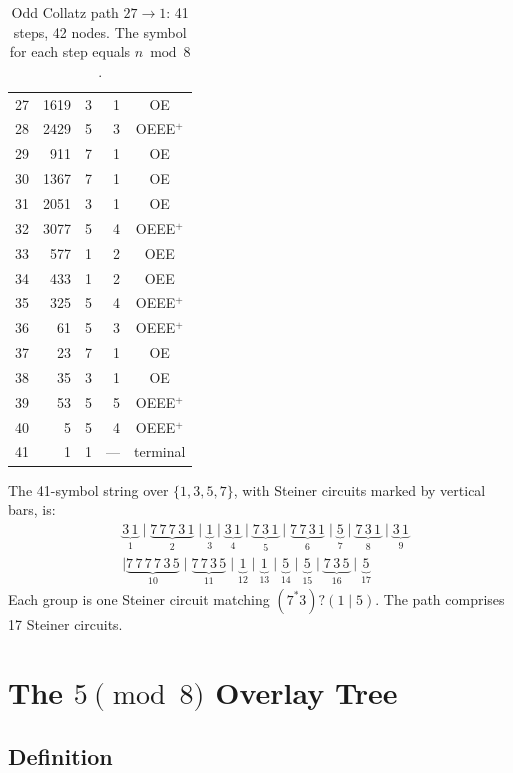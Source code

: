 \documentclass[11pt]{article}
\begin{document}
\begin{table}[h]
\begin{minipage}[t]{0.48\textwidth}
\begin{tabular}{rrrrc}
27 & 1619 & 3 & 1 & OE       \\
28 & 2429 & 5 & 3 & OEEE$^+$ \\
29 & 911  & 7 & 1 & OE       \\
30 & 1367 & 7 & 1 & OE       \\
31 & 2051 & 3 & 1 & OE       \\
32 & 3077 & 5 & 4 & OEEE$^+$ \\
33 & 577  & 1 & 2 & OEE      \\
34 & 433  & 1 & 2 & OEE      \\
35 & 325  & 5 & 4 & OEEE$^+$ \\
36 & 61   & 5 & 3 & OEEE$^+$ \\
37 & 23   & 7 & 1 & OE       \\
38 & 35   & 3 & 1 & OE       \\
39 & 53   & 5 & 5 & OEEE$^+$ \\
40 & 5    & 5 & 4 & OEEE$^+$ \\
41 & 1    & 1 & — & terminal \\
\hline
\end{tabular}
\end{minipage}
\caption{Odd Collatz path $27\to 1$: 41 steps, 42 nodes.  The symbol
  for each step equals $n\bmod 8$.}
\label{tab:path}
\end{table}

The 41-symbol string over $\{1,3,5,7\}$, with Steiner circuits marked by
vertical bars, is:
\begin{align*}
&\underbrace{3\,1}_{1}\mid
 \underbrace{7\,7\,7\,3\,1}_{2}\mid
 \underbrace{1}_{3}\mid
 \underbrace{3\,1}_{4}\mid
 \underbrace{7\,3\,1}_{5}\mid
 \underbrace{7\,7\,3\,1}_{6}\mid
 \underbrace{5}_{7}\mid
 \underbrace{7\,3\,1}_{8}\mid
 \underbrace{3\,1}_{9}\\
&\mid
 \underbrace{7\,7\,7\,7\,3\,5}_{10}\mid
 \underbrace{7\,7\,3\,5}_{11}\mid
 \underbrace{1}_{12}\mid
 \underbrace{1}_{13}\mid
 \underbrace{5}_{14}\mid
 \underbrace{5}_{15}\mid
 \underbrace{7\,3\,5}_{16}\mid
 \underbrace{5}_{17}
\end{align*}
Each group is one Steiner circuit matching $(7^*3)?(1\mid 5)$.
The path comprises 17 Steiner circuits.

\section{The $5\pmod{8}$ Overlay Tree}

\subsection{Definition}
\end{document}
